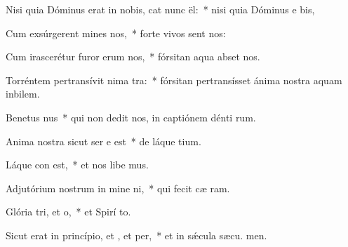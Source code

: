 \item Nisi quia Dóminus erat in nobis, cat nunc ël:~* nisi quia Dóminus e  bis,
\item Cum exsúrgerent mines  nos,~* forte vivos sent nos:
\item Cum irascerétur furor erum  nos,~* fórsitan aqua abset nos.
\item Torréntem pertransívit nima tra:~* fórsitan pertransísset ánima nostra aquam inbilem.
\item Benetus nus~* qui non dedit nos, in captiónem dénti rum.
\item Anima nostra sicut ser e est~* de láque tium.
\item Láque con est,~* et nos libe mus.
\item Adjutórium nostrum in mine ni,~* qui fecit cæ  ram.
\item Glória tri, et o,~* et Spirí to.
\item Sicut erat in princípio, et , et per,~* et in sǽcula sæcu. men.
